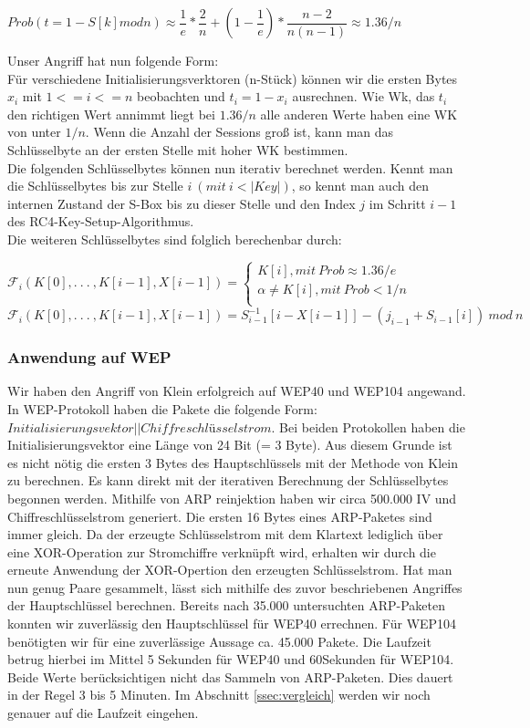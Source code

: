 \documentclass[10pt,a4paper]{article}
\begin{document}
\begin{center}
$Prob( t = 1 - S[k] mod n) \approx \dfrac{1}{e} * \dfrac{2}{n} + ( 1- \dfrac{1}{e}) * \dfrac{n-2}{n(n-1)} \approx 1.36/n$
\end{center}
Unser Angriff hat nun folgende Form:\\
Für verschiedene Initialisierungsverktoren (n-Stück) können wir die ersten Bytes $x_i$ mit $1 <= i <= n$ beobachten und $t_i = 1 - x_i$ ausrechnen. Wie Wk, das $t_i$ den richtigen Wert annimmt liegt bei $1.36/n$ alle anderen Werte haben eine WK von unter $1/n$. Wenn die Anzahl der Sessions groß ist, kann man das Schlüsselbyte an der ersten Stelle mit hoher WK bestimmen.\\
Die folgenden Schlüsselbytes können nun iterativ berechnet werden. Kennt man die Schlüsselbytes bis zur Stelle $i\ ( mit\  i < |Key|)$, so kennt man auch den internen Zustand der S-Box bis zu dieser Stelle und den Index $j$ im Schritt $i - 1$ des RC4-Key-Setup-Algorithmus. \\
Die weiteren Schlüsselbytes sind folglich berechenbar durch:
\begin{center}
$\mathcal{F}_i(K[0], .\ .\ .\ ,K[i-1],X[i-1]) = \begin{cases} K[i], mit \ Prob \approx 1.36/e \\ \alpha \neq K[i], mit \ Prob < 1/n \\\end{cases}$
\\\vspace{1em}
$\mathcal{F}_i(K[0], .\ .\ .\ ,K[i-1],X[i-1]) = S^{-1}_{i-1}[i-X[i-1]] - (j_{i-1}+S_{i-1}[i]) \ mod \ n$
\end{center}
 

\subsubsection{Anwendung auf WEP}
Wir haben den Angriff von Klein erfolgreich auf WEP40 und WEP104 angewand.
In WEP-Protokoll haben die Pakete die folgende Form: $Initialisierungsvektor || Chiffreschlüsselstrom $. Bei beiden Protokollen haben die Initialisierungsvektor eine Länge von 24 Bit (= 3 Byte). Aus diesem Grunde ist es nicht nötig die ersten 3 Bytes des Hauptschlüssels mit der Methode von Klein zu berechnen. Es kann direkt mit der iterativen Berechnung der Schlüsselbytes begonnen werden. Mithilfe von ARP reinjektion haben wir circa 500.000 IV und Chiffreschlüsselstrom generiert. Die ersten 16 Bytes eines ARP-Paketes sind immer gleich. Da der erzeugte Schlüsselstrom mit dem Klartext lediglich über eine XOR-Operation zur Stromchiffre verknüpft wird, erhalten wir durch die erneute Anwendung der XOR-Opertion den erzeugten Schlüsselstrom. Hat man nun genug Paare gesammelt, lässt sich mithilfe des zuvor beschriebenen Angriffes der Hauptschlüssel berechnen. Bereits nach 35.000 untersuchten ARP-Paketen konnten wir zuverlässig den Hauptschlüssel für WEP40 errechnen. Für WEP104 benötigten wir für eine zuverlässige Aussage ca. 45.000 Pakete. Die Laufzeit betrug hierbei im Mittel 5 Sekunden für WEP40 und 60Sekunden für WEP104. Beide Werte berücksichtigen nicht das Sammeln von ARP-Paketen. Dies dauert in der Regel 3 bis 5 Minuten. Im Abschnitt \ref{ssec:vergleich} werden wir noch genauer auf die Laufzeit eingehen.
\end{document}
